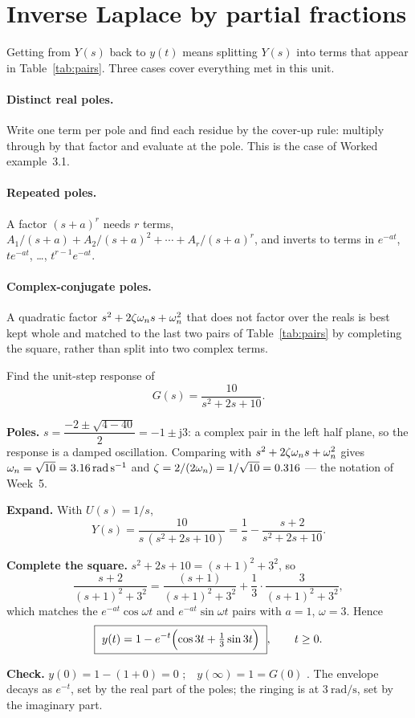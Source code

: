 \documentclass[11pt,a4paper]{article}
\begin{document}
\section{Inverse Laplace by partial fractions}
\label{sec:partial}

Getting from $Y(s)$ back to $y(t)$ means splitting $Y(s)$ into terms that
appear in Table~\ref{tab:pairs}. Three cases cover everything met in this unit.

\paragraph{Distinct real poles.} Write one term per pole and find each residue
by the cover-up rule: multiply through by that factor and evaluate at the pole.
This is the case of Worked example~3.1.

\paragraph{Repeated poles.} A factor $(s+a)^{r}$ needs $r$ terms,
$A_1/(s+a)+A_2/(s+a)^2+\cdots+A_r/(s+a)^r$, and inverts to terms in
$e^{-at}$, $te^{-at}$, \dots, $t^{r-1}e^{-at}$.

\paragraph{Complex-conjugate poles.} A quadratic factor
$s^{2}+2\zeta\omega_{n} s+\omega_{n}^{2}$ that does not factor over the reals is best kept
whole and matched to the last two pairs of Table~\ref{tab:pairs} by completing
the square, rather than split into two complex terms.

\begin{workedex}[breakable, title=Worked example 3.3 --- a complex-pole step response]
Find the unit-step response of
\[
  G(s) = \frac{10}{s^{2}+2s+10} .
\]

\textbf{Poles.} $s = \dfrac{-2\pm\sqrt{4-40}}{2} = -1\pm\mathrm{j}3$: a complex
pair in the left half plane, so the response is a damped oscillation. Comparing
with $s^{2}+2\zeta\omega_{n} s + \omega_{n}^{2}$ gives
$\omega_{n}=\sqrt{10}=\SI{3.16}{\radian\per\second}$ and
$\zeta = 2/(2\omega_{n}) = 1/\sqrt{10}=0.316$ --- the notation of Week~5.

\textbf{Expand.} With $U(s)=1/s$,
\[
  Y(s) = \frac{10}{s\,(s^{2}+2s+10)} = \frac{1}{s} - \frac{s+2}{s^{2}+2s+10} .
\]

\textbf{Complete the square.} $s^{2}+2s+10=(s+1)^{2}+3^{2}$, so
\[
  \frac{s+2}{(s+1)^{2}+3^{2}}
  = \frac{(s+1)}{(s+1)^{2}+3^{2}} + \frac{1}{3}\cdot\frac{3}{(s+1)^{2}+3^{2}} ,
\]
which matches the $e^{-at}\cos\omega t$ and $e^{-at}\sin\omega t$ pairs with
$a=1$, $\omega=3$. Hence
\[
  \boxed{\ y(t) = 1 - e^{-t}\Bigl(\cos 3t + \tfrac{1}{3}\sin 3t\Bigr)\ },
  \qquad t\ge0 .
\]

\textbf{Check.} $y(0)=1-(1+0)=0$ \checkmark;\ \ $y(\infty)=1=G(0)$ \checkmark.
The envelope decays as $e^{-t}$, set by the real part of the poles; the
ringing is at $\SI{3}{\radian\per\second}$, set by the imaginary part.
\end{workedex}
\end{document}
